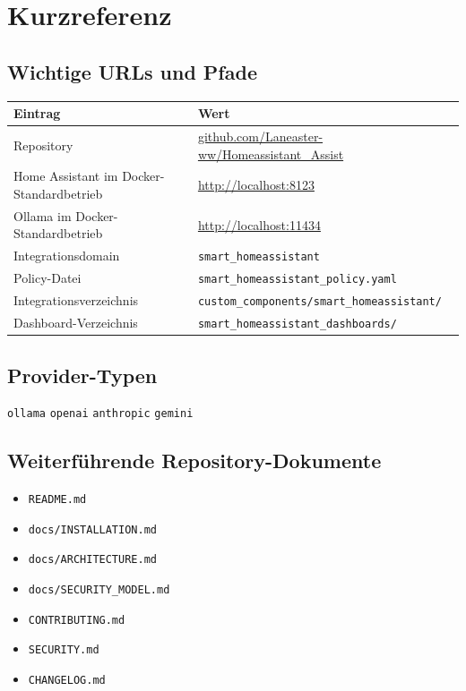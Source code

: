 \documentclass[
  11pt,
  a4paper,
  oneside,
  parskip=half
]{scrreprt}
\newcommand{\code}[1]{\texttt{#1}}
\newcommand{\projecturl}{https://github.com/Laneaster-ww/Homeassistant\_Assist}
\begin{document}
\appendix

\chapter{Kurzreferenz}

\section{Wichtige URLs und Pfade}

\begin{tabularx}{\textwidth}{@{}L{58mm}Y@{}}
  \toprule
  \textbf{Eintrag} & \textbf{Wert} \\
  \midrule
  Repository & \href{\projecturl}{github.com/Laneaster-ww/Homeassistant\_Assist} \\
  Home Assistant im Docker-Standardbetrieb & \url{http://localhost:8123} \\
  Ollama im Docker-Standardbetrieb & \url{http://localhost:11434} \\
  Integrationsdomain & \code{smart\_homeassistant} \\
  Policy-Datei & \code{smart\_homeassistant\_policy.yaml} \\
  Integrationsverzeichnis & \code{custom\_components/smart\_homeassistant/} \\
  Dashboard-Verzeichnis & \code{smart\_homeassistant\_dashboards/} \\
  \bottomrule
\end{tabularx}

\section{Provider-Typen}

\begin{center}
  \code{ollama}
  \quad
  \code{openai}
  \quad
  \code{anthropic}
  \quad
  \code{gemini}
\end{center}

\section{Weiterführende Repository-Dokumente}

\begin{itemize}
  \item \code{README.md}
  \item \code{docs/INSTALLATION.md}
  \item \code{docs/ARCHITECTURE.md}
  \item \code{docs/SECURITY\_MODEL.md}
  \item \code{CONTRIBUTING.md}
  \item \code{SECURITY.md}
  \item \code{CHANGELOG.md}
\end{itemize}
\end{document}
